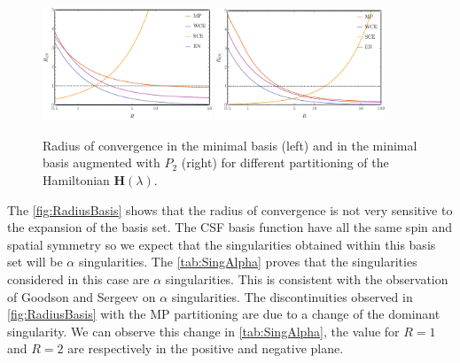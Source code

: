 \documentclass[11pt,a4paper]{article}
\newcommand{\bH}{\mathbf{H}}
\begin{document}
\begin{figure}[h!]
    \centering
    \includegraphics[width=0.45\textwidth]{PartitioningRCV2.pdf}
    \includegraphics[width=0.45\textwidth]{PartitioningRCV3.pdf}
    \caption{\centering Radius of convergence in the minimal basis (left) and in the minimal basis augmented with $P_2$ (right) for different partitioning of the Hamiltonian $\bH(\lambda)$.}
    \label{fig:RadiusPartitioning}
\end{figure}

The \autoref{fig:RadiusBasis} shows that the radius of convergence is not very sensitive to the expansion of the basis set. The CSF basis function have all the same spin and spatial symmetry so we expect that the singularities obtained within this basis set will be $\alpha$ singularities. The \autoref{tab:SingAlpha} proves that the singularities considered in this case are $\alpha$ singularities. This is consistent with the observation of Goodson and Sergeev \cite{Goodson_2004} on $\alpha$ singularities. The discontinuities observed in \autoref{fig:RadiusBasis} with the MP partitioning are due to a change of the dominant singularity. We can observe this change in \autoref{tab:SingAlpha}, the value for $R=1$ and $R=2$ are respectively in the positive and negative plane.
\end{document}
